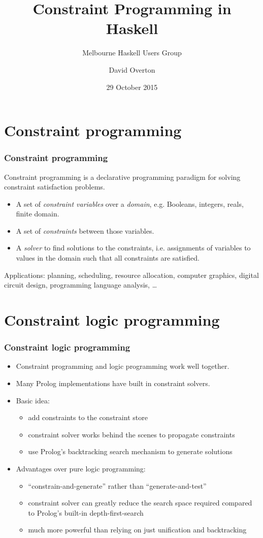 \documentclass[aspectratio=169,hyphens]{beamer} %
\title{Constraint Programming in Haskell}
\subtitle{Melbourne Haskell Users Group}
\author{David Overton}
\date{29 October 2015}
\begin{document}
\frame{\titlepage}

\section{Constraint programming}

\begin{frame}
    \frametitle{Constraint programming}
    Constraint programming is a declarative programming paradigm for solving constraint satisfaction problems.
    \pause
    \begin{itemize}
        \item A set of \emph{constraint variables} over a \emph{domain}, e.g. Booleans, integers, reals, finite domain.
        \item A set of \emph{constraints} between those variables.
        \item A \emph{solver} to find solutions to the constraints, i.e. assignments of variables to values in the domain such that all constraints are satisfied.
    \end{itemize}
    \pause
    Applications: planning, scheduling, resource allocation, computer graphics, digital circuit design, programming language analysis, \ldots
\end{frame}

\section{Constraint logic programming}

\begin{frame}
    \frametitle{Constraint logic programming}
    \begin{itemize}
        \item Constraint programming and logic programming work well together.
        \item Many Prolog implementations have built in constraint solvers.
        \item Basic idea:
            \begin{itemize}
                \item add constraints to the constraint store
                \item constraint solver works behind the scenes to propagate constraints
                \item use Prolog's backtracking search mechanism to generate solutions
            \end{itemize}
        \item Advantages over pure logic programming:
            \begin{itemize}
                \item ``constrain-and-generate'' rather than ``generate-and-test''
                \item constraint solver can greatly reduce the search space required compared to Prolog's built-in depth-first-search
                \item much more powerful than relying on just unification and backtracking
            \end{itemize}
    \end{itemize}
\end{frame}
\end{document}
